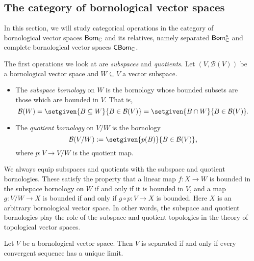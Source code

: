 \subsection{The category of bornological vector spaces}



In this section, we will study categorical operations in the category of bornological vector spaces \(\mathsf{Born}_\mathbb C\) and its relatives, namely separated \(\mathsf{Born}_{\mathbb C}^s\) and complete bornological vector spaces \(\mathsf{CBorn}_\mathbb C\).


The first operations we look at are \textit{subspaces} and \textit{quotients}. Let \((V, \mathcal{B}(V))\) be a bornological vector space and \(W \subseteq V\) a vector subspace. 

\begin{itemize}
    \item The \textit{subspace bornology} on \(W\) is the bornology whose bounded subsets are those which are bounded in \(V\). That is, 
    \[\mathcal{B}(W) = \setgiven{B \subseteq W}{B \in \mathcal{B}(V)} = \setgiven{B \cap W}{B \in \mathcal{B}(V)}.\]
    \item The \textit{quotient bornology} on \(V/W\) is the bornology \[\mathcal{B}(V/W) \defeq \setgiven{p(B)}{B \in \mathcal{B}(V)},\] where \(p \colon V \to V/W\) is the quotient map.
\end{itemize}

We always equip subspaces and quotients with the subspace and quotient bornologies. These satisfy the property that a linear map \(f \colon X \to W\) is bounded in the subspace bornology on \(W\) if and only if it is bounded in \(V\), and a map \(g \colon V/W \to X\) is bounded if and only if \(g \circ p \colon V \to X\) is bounded. Here \(X\) is an arbitrary bornological vector space. In other words, the subspace and quotient bornologies play the role of the subspace and quotient topologies in the theory of topological vector spaces.



\begin{lemma}\label{lem:sequential-separatedness}
    Let \(V\) be a bornological vector space. Then \(V\) is separated if and only if every convergent sequence has a unique limit. 
\end{lemma}

